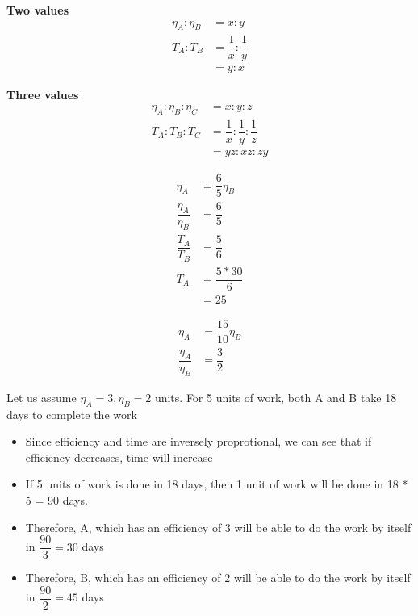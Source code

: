 \begin{multicols}{2}
    \textbf{Two values}    
    \begin{align*}
        \eta_A : \eta_B &= x : y \\
        T_A : T_B &= \dfrac{1}{x} : \dfrac{1}{y} \\
        &= y : x \tag{Multiply by $LCM(x,y)$}
    \end{align*}

    \columnbreak
    \textbf{Three values}    
    \begin{align*}
        \eta_A : \eta_B : \eta_C &= x : y : z \\
        T_A : T_B : T_C &= \dfrac{1}{x} : \dfrac{1}{y} : \dfrac{1}{z} \\
        &= yz : xz : zy \tag{Multiply by $LCM(x,y,z)$}
    \end{align*}
    
\end{multicols}


\begin{align*}
    \eta_A &= \dfrac{6}{5} \eta_B \tag{Provided in question} \\
    \dfrac{\eta_A}{\eta_B} &= \dfrac{6}{5} \\
    \dfrac{T_A}{T_B} &= \dfrac{5}{6} \tag{Efficiency and time are inversely proprotional} \\
    T_A &= \dfrac{5 * 30}{6} \\
    &= 25 
\end{align*}


\begin{align*}
    \eta_A &= \dfrac{15}{10} \eta_B \\
    \dfrac{\eta_A}{\eta_B} &= \dfrac{3}{2}
\end{align*}

Let us assume $\eta_A = 3, \eta_B = 2$ units. For 5 units of work, both A and B take 18 days to complete the work 

\begin{itemize}
    \item Since efficiency and time are inversely proprotional, we can see that if efficiency decreases, time will increase
    \item If 5 units of work is done in 18 days, then 1 unit of work will be done in 18 * 5 = 90 days.
    \item Therefore, A, which has an efficiency of 3 will be able to do the work by itself in $\dfrac{90}{3} = 30$ days
    \item Therefore, B, which has an efficiency of 2 will be able to do the work by itself in $\dfrac{90}{2} = 45$ days
\end{itemize}